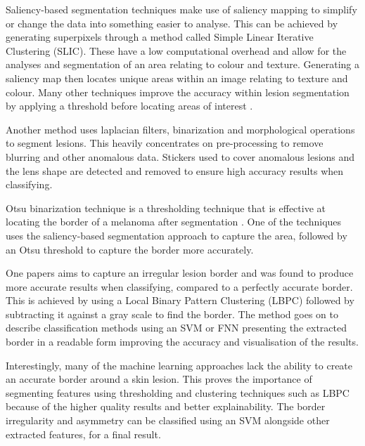 \documentclass[12pt]{report}
\begin{document}
Saliency-based segmentation techniques \cite{Ahn2017b, Olugbara2018} make use of saliency mapping to simplify or change the data into something easier to analyse. This can be achieved by generating superpixels through a method called Simple Linear Iterative Clustering (SLIC). These have a low computational overhead and allow for the analyses and segmentation of an area relating to colour and texture. Generating a saliency map then locates unique areas within an image relating to texture and colour. Many other techniques improve the accuracy within lesion segmentation by applying a threshold before locating areas of interest \cite{Hu2019b, Fan2017}.

Another method uses laplacian filters, binarization and morphological operations to segment lesions. This heavily concentrates on pre-processing to remove \cite{Bibi2018} blurring and other anomalous data. Stickers used to cover anomalous lesions and the lens shape are detected and removed to ensure high accuracy results when classifying.

Otsu binarization technique is a thresholding technique that is effective at locating the border of a melanoma after segmentation \cite{Fan2017a, Meskini2018}. One of the techniques uses the saliency-based segmentation approach to capture the area, followed by an Otsu threshold to capture the border more accurately.

One papers aims to capture an irregular lesion border and was found to produce more accurate results when classifying, compared to a perfectly accurate border. This is achieved by using a Local Binary Pattern Clustering (LBPC) \cite{Pereira2020} followed by subtracting it against a gray scale to find the border. The method goes on to describe classification methods using an SVM or FNN presenting the extracted border in a readable form improving the accuracy and visualisation of the results.

Interestingly, many of the machine learning approaches lack the ability to create an accurate border around a skin lesion. This proves the importance of segmenting features using thresholding and clustering techniques such as LBPC because of the higher quality results and better explainability. The border irregularity and asymmetry can be classified using an SVM alongside other extracted features, for a final result.
\end{document}
